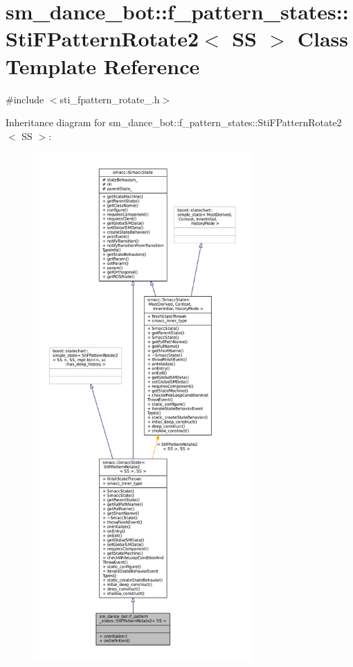 \hypertarget{structsm__dance__bot_1_1f__pattern__states_1_1StiFPatternRotate2}{}\section{sm\+\_\+dance\+\_\+bot\+:\+:f\+\_\+pattern\+\_\+states\+:\+:Sti\+F\+Pattern\+Rotate2$<$ SS $>$ Class Template Reference}
\label{structsm__dance__bot_1_1f__pattern__states_1_1StiFPatternRotate2}


{\ttfamily \#include $<$sti\+\_\+fpattern\+\_\+rotate\+\_.\+h$>$}



Inheritance diagram for sm\+\_\+dance\+\_\+bot\+:\+:f\+\_\+pattern\+\_\+states\+:\+:Sti\+F\+Pattern\+Rotate2$<$ SS $>$\+:
\nopagebreak
\begin{figure}[H]
\begin{center}
\leavevmode
\includegraphics[height=550pt]{structsm__dance__bot_1_1f__pattern__states_1_1StiFPatternRotate2__inherit__graph}
\end{center}
\end{figure}


